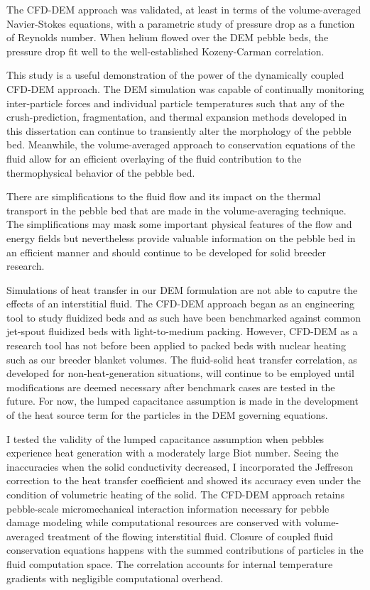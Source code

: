 The CFD-DEM approach was validated, at least in terms of the volume-averaged Navier-Stokes equations, with a parametric study of pressure drop as a function of Reynolds number. When helium flowed over the DEM pebble beds, the pressure drop fit well to the well-established Kozeny-Carman correlation.

This study is a useful demonstration of the power of the dynamically coupled CFD-DEM approach. The DEM simulation was capable of continually monitoring inter-particle forces and individual particle temperatures such that any of the crush-prediction, fragmentation, and thermal expansion methods developed in this dissertation can continue to transiently alter the morphology of the pebble bed. Meanwhile, the volume-averaged approach to conservation equations of the fluid allow for an efficient overlaying of the fluid contribution to the thermophysical behavior of the pebble bed.

There are simplifications to the fluid flow and its impact on the thermal transport in the pebble bed that are made in the volume-averaging technique. The simplifications may mask some important physical features of the flow and energy fields but nevertheless provide valuable information on the pebble bed in an efficient manner and should continue to be developed for solid breeder research.


Simulations of heat transfer in our DEM formulation are not able to caputre the effects of an interstitial fluid. The CFD-DEM approach began as an engineering tool to study fluidized beds and as such have been benchmarked against common jet-spout fluidized beds with light-to-medium packing. However, CFD-DEM as a research tool has not before been applied to packed beds with nuclear heating such as our breeder blanket volumes. The fluid-solid heat transfer correlation, as developed for non-heat-generation situations, will continue to be employed until modifications are deemed necessary after benchmark cases are tested in the future. For now, the lumped capacitance assumption is made in the development of the heat source term for the particles in the DEM governing equations.

I tested the validity of the lumped capacitance assumption when pebbles experience heat generation with a moderately large Biot number. Seeing the inaccuracies when the solid conductivity decreased, I incorporated the Jeffreson correction to the heat transfer coefficient and showed its accuracy even under the condition of volumetric heating of the solid. The CFD-DEM approach retains pebble-scale micromechanical interaction information necessary for pebble damage modeling while computational resources are conserved with volume-averaged treatment of the flowing interstitial fluid. Closure of coupled fluid conservation equations happens with the summed contributions of particles in the fluid computation space. The correlation accounts for internal temperature gradients with negligible computational overhead.

